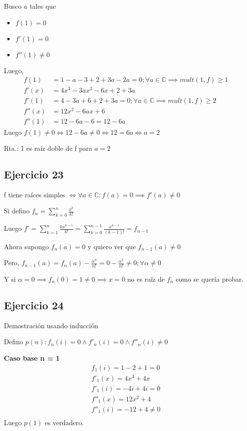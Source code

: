 Busco $a$ tales que
\begin{itemize}
    \item $ f(1) = 0 $
    \item $ f'(1) = 0 $
    \item $ f''(1) \neq 0 $
\end{itemize}
Luego,
\begin{align*}
    f(1) &= 1-a-3+2+3a-2a = 0; \forall a \in \mathbb{C} \implies mult(1, f) \geq 1 \\
    f'(x) &= 4x^3 - 3ax^2  -6x + 2 + 3a \\
    f'(1) &= 4-3a+6+2+3a = 0; \forall a \in \mathbb{C} \implies mult(1, f) \geq 2 \\
    f''(x) &= 12x^2 - 6ax + 6 \\
    f''(1) &= 12-6a-6 = 12-6a
\end{align*}
Luego $f(1) \neq 0 \iff 12-6a \neq 0 \iff 12 = 6a \iff a = 2 $

Rta.: 1 es raíz doble de f para $ a = 2 $

\subsection{Ejercicio 23}

f tiene raíces simples $ \iff \forall a \in \mathbb{C}: f(a) = 0 \implies f'(a) \neq 0 $

Si defino $ f_n = \sum_{k = 0}^{n}\frac{x^k}{k!} $

Luego $ f' = \sum_{k = 1}^{n}\frac{kx^{k-1}}{k!} = \sum_{k = 0}^{n-1}\frac{x^{k-1}}{(k-1)!} = f_{n-1} $

Ahora supongo $ f_n(a) = 0 $ y quiero ver que $ f_{n-1}(a) \neq 0 $

Pero, $ f_{n-1}(a) = f_n(a) - \frac{\alpha^n}{n!} = 0 - \frac{\alpha^n}{n!} \neq 0; \forall \alpha \neq 0 $

Y si $ \alpha = 0 \implies f_n(0) = 1 \neq 0 \implies x = 0 $ no es raíz de $ f_n $ como se quería probar.

\subsection{Ejercicio 24}

Demostración usando inducción

Defino $ p(n): f_n(i) = 0 \wedge f'_n(i) = 0 \wedge f''_n(i) \neq 0 $

\textbf{Caso base n = 1}
\begin{align*}
    f_1(i) = 1-2+1 = 0 \\
    f'_1(x) = 4x^3+4x \\
    f'_1(i) = -4i + 4i = 0 \\
    f''_1(x) = 12x^2 + 4 \\
    f''_1(i) = -12+4 \neq 0 \\
\end{align*}
Luego $ p(1) $ es verdadero.

